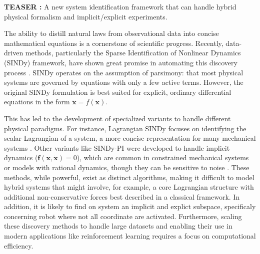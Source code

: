 \documentclass[12pt]{article}
\begin{document}
\noindent
\textbf{TEASER : } A new system identification framework that can handle hybrid physical formalism and implicit/explicit experiments.

\noindent
The ability to distill natural laws from observational data into concise mathematical equations is a cornerstone of scientific progress. Recently, data-driven methods, particularly the Sparse Identification of Nonlinear Dynamics (SINDy) framework, have shown great promise in automating this discovery process \cite{bruntonDiscoveringGoverningEquations2016}. SINDy operates on the assumption of parsimony: that most physical systems are governed by equations with only a few active terms. However, the original SINDy formulation is best suited for explicit, ordinary differential equations in the form $\dot{\mathbf{x}} = f(\mathbf{x})$.

This has led to the development of specialized variants to handle different physical paradigms. For instance, Lagrangian SINDy focuses on identifying the scalar Lagrangian of a system, a more concise representation for many mechanical systems \cite{chuchuDiscoveringInterpretableDynamics2020,purnomoSparseIdentificationLagrangian2023}. Other variants like SINDy-PI were developed to handle implicit dynamics ($\mathbf{f}(\mathbf{x}, \dot{\mathbf{x}}) = 0$), which are common in constrained mechanical systems or models with rational dynamics, though they can be sensitive to noise \cite{kahemanSINDyPIRobustAlgorithm2020}. These methods, while powerful, exist as distinct algorithms, making it difficult to model hybrid systems that might involve, for example, a core Lagrangian structure with additional non-conservative forces best described in a classical framework. In addition, it is likely to find on system an implicit and explict subspace, specificaly concerning robot where not all coordinate are activated. Furthermore, scaling these discovery methods to handle large datasets and enabling their use in modern applications like reinforcement learning requires a focus on computational efficiency.
\end{document}

